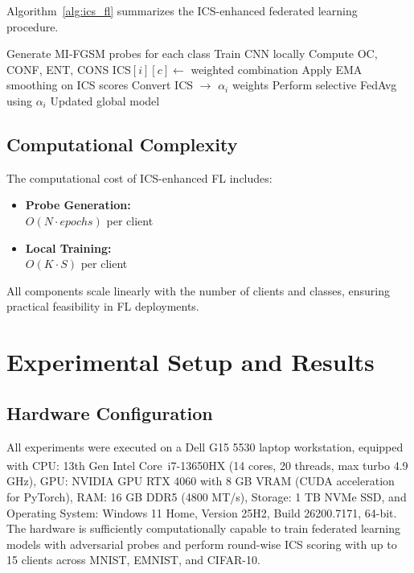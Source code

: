 \documentclass[conference]{IEEEtran}
\begin{document}
Algorithm~\ref{alg:ics_fl} summarizes the ICS-enhanced federated learning procedure.

\begin{algorithm}[t]
\caption{ICS-Enhanced Federated Learning}
\label{alg:ics_fl}
\begin{algorithmic}[1]
    \STATE Generate MI-FGSM probes for each class
        \STATE Train CNN locally
            \STATE Compute OC, CONF, ENT, CONS
            \STATE ICS$[i][c] \gets$ weighted combination
        \ENDFOR
        \STATE Apply EMA smoothing on ICS scores
        \STATE Convert ICS $\to$ $\alpha_i$ weights
    \ENDFOR
    \STATE Perform selective FedAvg using $\alpha_i$
\ENDFOR
\RETURN Updated global model
\end{algorithmic}
\end{algorithm}

\subsection{Computational Complexity}
\label{sec:complexity}
The computational cost of ICS-enhanced FL includes:
\begin{itemize}
    \item \textbf{Probe Generation:} \\
    $O(N \cdot epochs)$ per client
    
    \item \textbf{Local Training:} \\
    $O(K \cdot S)$ per client
\end{itemize}
All components scale linearly with the number of clients and classes, ensuring practical feasibility in FL deployments.

\section{Experimental Setup and Results}
\label{sec:exp}

\subsection{Hardware Configuration}
All experiments were executed on a Dell G15 5530 laptop workstation, equipped with CPU: 13th Gen Intel\textsuperscript{\textregistered} Core\texttrademark~i7-13650HX (14 cores, 20 threads, max turbo 4.9 GHz), GPU: NVIDIA GPU RTX 4060 with 8 GB VRAM (CUDA acceleration for PyTorch), RAM: 16 GB DDR5 (4800 MT/s), Storage: 1 TB NVMe SSD, and Operating System: Windows 11 Home, Version 25H2, Build 26200.7171, 64-bit. The hardware is sufficiently computationally capable to train federated learning models with adversarial probes and perform round-wise ICS scoring with up to 15 clients across MNIST, EMNIST, and CIFAR-10.
\end{document}
